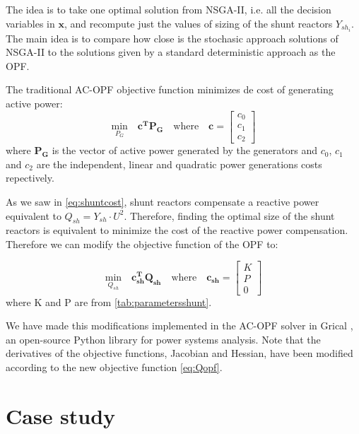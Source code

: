 \documentclass[a4paper,11pt, titlepage, twoside]{article}
\begin{document}
The idea is to take one optimal solution from NSGA-II, i.e. all the decision variables in $\mathbf{x}$, and recompute just the values of sizing of the shunt reactors $Y_{sh_i}$. The main idea is to compare how close is the 
stochasic approach solutions of NSGA-II to the solutions given by a standard deterministic approach as the OPF. \par


The traditional AC-OPF objective function \cite{opfnotes} minimizes de cost of generating active power:
\begin{equation}
    \underset{P_G}{\text{min}} \quad \mathbf{c^T} \mathbf{P_G} \quad \text{where} \quad \mathbf{c} = \begin{bmatrix} c_0 \\ c_1 \\ c_2 \end{bmatrix}
\end{equation}
where $\mathbf{P_G}$ is the vector of active power generated by the generators and $c_0$, $c_1$ and $c_2$ are the independent, linear and quadratic power generations costs repectively.

As we saw in \ref{eq:shuntcost}, shunt reactors compensate a reactive power equivalent to $Q_{sh} = Y_{sh} \cdot U^2$. Therefore, finding the optimal size of the shunt reactors is equivalent
to minimize the cost of the reactive power compensation. Therefore we can modify the objective function of the OPF to:

\begin{equation}\label{eq:Qopf}
\underset{Q_{sh}}{\text{min}} \quad \mathbf{c_{sh}^T} \mathbf{Q_{sh}} \quad \text{where} \quad \mathbf{c_{sh}} = \begin{bmatrix} K \\ P \\ 0 \end{bmatrix}
\end{equation}
where K and P are from \ref{tab:parametersshunt}.\par
We have made this modifications implemented in the AC-OPF solver in Grical \cite{gridcal}, an open-source Python library for power systems analysis. Note that the derivatives of the objective functions, Jacobian and Hessian, have
been modified according to the new objective function \ref{eq:Qopf}.
\section{Case study}\label{CaseStudies}
\end{document}
